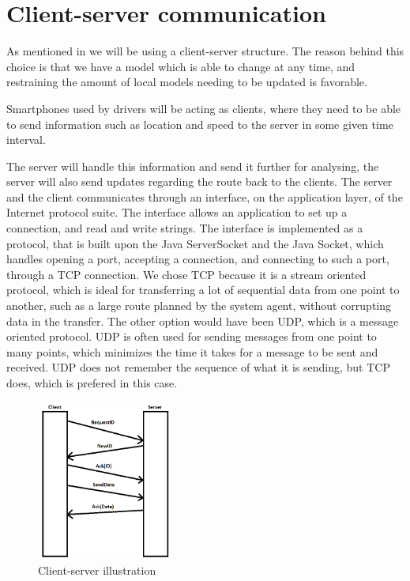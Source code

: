 \section{Client-server communication}
\label{chap:clientserver}
As mentioned in  we will be using a client-server structure.
The reason behind this choice is that we have a model which is able to change at any time, and restraining the amount of local models needing to be updated is favorable.

Smartphones used by drivers will be acting as clients,
where they need to be able to send information such as location and speed to the server in some given time interval.

The server will handle this information and send it further for analysing, the server will also send updates regarding the route back to the clients. The server and the client communicates through an interface, on the application layer, of the Internet protocol suite. The interface allows an application to set up a connection, and read and write strings. The interface is implemented as a protocol, that is built upon the Java ServerSocket and the Java Socket,
which handles opening a port, accepting a connection, and connecting to such a port, through a TCP connection. We chose TCP because it is a stream oriented protocol,
which is ideal for transferring a lot of sequential data from one point to another,
such as a large route planned by the system agent, without corrupting data in the transfer.
The other option would have been UDP, which is a message oriented protocol. UDP is often used for sending messages from one point to many points,
which minimizes the time it takes for a message to be sent and received.
UDP does not remember the sequence of what it is sending, but TCP does, which is prefered in this case.

\begin{figure}[h!]
  \centering
    \includegraphics[width=0.4\textwidth]{figures/clientserver.png}
    \caption{Client-server illustration}
    \label{fig:clientserver}
\end{figure}

